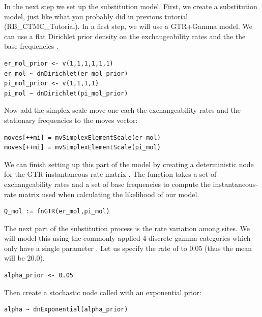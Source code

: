 In the next step we set up the substitution model.
First, we create a substitution model, just like what you probably did in previous tutorial (\EG RB\_CTMC\_Tutorial). 
In a first step, we will use a GTR+Gamma model.
We can use a flat Dirichlet prior density on the exchangeability rates  and the the base frequencies .
{\tt \begin{snugshade*}
\begin{lstlisting}
er_mol_prior <- v(1,1,1,1,1,1) 
er_mol ~ dnDirichlet(er_mol_prior)
pi_mol_prior <- v(1,1,1,1) 
pi_mol ~ dnDirichlet(pi_mol_prior)
\end{lstlisting}
\end{snugshade*}}
Now add the simplex scale move one each the exchangeability rates  and the stationary frequencies  to the moves vector:
{\tt \small \begin{snugshade*}
\begin{lstlisting}
moves[++mi] = mvSimplexElementScale(er_mol) 
moves[++mi] = mvSimplexElementScale(pi_mol)  
\end{lstlisting}
\end{snugshade*}}
We can finish setting up this part of the model by creating a deterministic node for the GTR instantaneous-rate matrix . 
The  function takes a set of exchangeability rates and a set of base frequencies to compute the instantaneous-rate matrix used when calculating the likelihood of our model.
{\tt \begin{snugshade*}
\begin{lstlisting}
Q_mol := fnGTR(er_mol,pi_mol)
\end{lstlisting}
\end{snugshade*}}
The next part of the substitution process is the rate variation among sites. We will model this using the commonly applied 4 discrete gamma categories which only have a single parameter .
Let us specify the rate of  to 0.05 (thus the mean will be 20.0).
{\tt\begin{snugshade*}
\begin{lstlisting}
alpha_prior <- 0.05                                                                             
\end{lstlisting}
\end{snugshade*}}
Then create a stochastic node called  with an exponential prior:
{\tt\begin{snugshade*}
\begin{lstlisting}
alpha ~ dnExponential(alpha_prior)
\end{lstlisting}
\end{snugshade*}}
